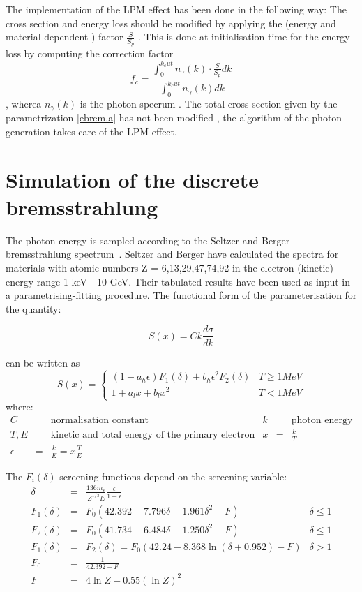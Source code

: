  The implementation of the LPM effect has been done in the following way:
The cross section and energy loss should be modified by applying the
 (energy and material dependent ) factor $\frac{S}{S_p}$ . This is done
at initialisation time for the energy loss by computing the correction
factor
\begin{equation}
\label{ebrem.r}
   f_c = \frac{\int_0^{k_cut} n_\gamma (k) \cdot \frac{S}{S_p} dk}
              {\int_0^{k_cut} n_\gamma (k) dk}
\end{equation}
 , wherea $n_\gamma (k)$ is the photon specrum .
 The total cross section given by the parametrization \ref{ebrem.a} has
not been modified , the algorithm of the photon generation takes care
of the LPM effect.

\section{Simulation of the discrete bremsstrahlung}

The photon energy is sampled according to the Seltzer and Berger
bremsstrahlung spectrum~\cite{ebrem.seltzer}.
 Seltzer and Berger have calculated the
spectra for materials with atomic numbers Z = 6,13,29,47,74,92
in the electron (kinetic) energy range  1 keV - 10 GeV. Their tabulated
results have been used as input in a parametrising-fitting procedure.
The functional form of the parameterisation for the quantity:

\[
S(x) = C k \frac{d \sigma}{d k}
\]

can be written as
\begin{equation}
\label{eq:phys341-1}
S(x) = \left \{
\begin{array}{ll}
(1-a_{h} \epsilon )F_{1}(\delta) + b_{h} \epsilon^{2} F_{2} (\delta)
& T \geq 1 MeV \\
1 + a_{l} x + b_{l} x^{2} & T < 1 MeV
\end{array} \right .
\end{equation}
where:
\[
\begin{array}{lcllcl} 
C & & \mbox{normalisation constant} &
k & & \mbox{photon energy} \\ [1mm]
T, E & & \mbox{kinetic and total energy of the primary electron} &
x & = & \frac{k}{T} \\ [2mm]
\epsilon & = & \frac{k}{E} = x \frac{T}{E}
\end{array}
\]

The $F_{i}(\delta)$ screening functions depend on the screening variable:
\[
\begin{array}{lcll}
\delta & = & \frac{136 m_{e}}{Z^{1/3} E} \frac{\epsilon}{1-\epsilon} \\
F_{1}(\delta) & = & F_{0} (42.392 - 7.796 \delta +1.961 \delta^{2} - F)
& \delta \leq 1 \\
F_{2}(\delta) & = & F_{0} (41.734 - 6.484 \delta +1.250 \delta^{2} - F)
& \delta \leq 1 \\
F_{1}(\delta) & = & F_{2}(\delta) =
F_{0} (42.24 - 8.368 \ln(\delta + 0.952) -F) & \delta > 1 \\
F_{0} & = & \frac{1}{42.392-F} \\
F & = & 4 \ln Z - 0.55 (\ln Z)^{2}
\end{array}
\]

